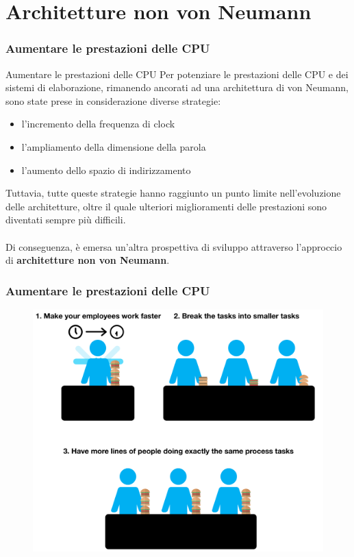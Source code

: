 \section[Architetture non von Neumann]{Architetture non von Neumann}
\label{sec:pipeline}
 

\begin{frame}
	\frametitle{Aumentare le prestazioni delle CPU}

	\begin{block}{Aumentare le prestazioni delle CPU}
		Per potenziare le prestazioni delle CPU e dei sistemi di elaborazione, rimanendo ancorati ad una architettura di von Neumann, sono state prese in considerazione diverse strategie:
		\begin{itemize}
			\item l'incremento della frequenza di clock
			\item l'ampliamento della dimensione della parola
			\item l'aumento dello spazio di indirizzamento
		\end{itemize}
		
		Tuttavia, tutte queste strategie hanno raggiunto un punto limite nell'evoluzione delle architetture, oltre il quale ulteriori miglioramenti delle prestazioni sono diventati sempre più difficili.\\~\\
		
		Di conseguenza, è emersa un'altra prospettiva di sviluppo attraverso l'approccio di \textbf{architetture non von Neumann}.
	\end{block}

\end{frame}


\begin{frame}
	\frametitle{Aumentare le prestazioni delle CPU}

	\begin{figure}[!htbp]
		\centering
		\includegraphics[width=0.73\linewidth]{images/7_pipeline/faster_cpu.pdf}
	\end{figure}
\end{frame}


